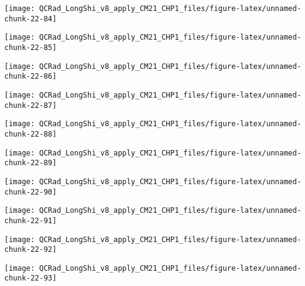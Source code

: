 \documentclass[
  10pt,
  a4paper,oneside]{article}
\begin{document}
\begin{center}\texttt{[image: QCRad\_LongShi\_v8\_apply\_CM21\_CHP1\_files/figure-latex/unnamed-chunk-22-84]} \end{center}

\begin{center}\texttt{[image: QCRad\_LongShi\_v8\_apply\_CM21\_CHP1\_files/figure-latex/unnamed-chunk-22-85]} \end{center}

\begin{center}\texttt{[image: QCRad\_LongShi\_v8\_apply\_CM21\_CHP1\_files/figure-latex/unnamed-chunk-22-86]} \end{center}

\begin{center}\texttt{[image: QCRad\_LongShi\_v8\_apply\_CM21\_CHP1\_files/figure-latex/unnamed-chunk-22-87]} \end{center}

\begin{center}\texttt{[image: QCRad\_LongShi\_v8\_apply\_CM21\_CHP1\_files/figure-latex/unnamed-chunk-22-88]} \end{center}

\begin{center}\texttt{[image: QCRad\_LongShi\_v8\_apply\_CM21\_CHP1\_files/figure-latex/unnamed-chunk-22-89]} \end{center}

\begin{center}\texttt{[image: QCRad\_LongShi\_v8\_apply\_CM21\_CHP1\_files/figure-latex/unnamed-chunk-22-90]} \end{center}

\begin{center}\texttt{[image: QCRad\_LongShi\_v8\_apply\_CM21\_CHP1\_files/figure-latex/unnamed-chunk-22-91]} \end{center}

\begin{center}\texttt{[image: QCRad\_LongShi\_v8\_apply\_CM21\_CHP1\_files/figure-latex/unnamed-chunk-22-92]} \end{center}

\begin{center}\texttt{[image: QCRad\_LongShi\_v8\_apply\_CM21\_CHP1\_files/figure-latex/unnamed-chunk-22-93]} \end{center}
\end{document}
